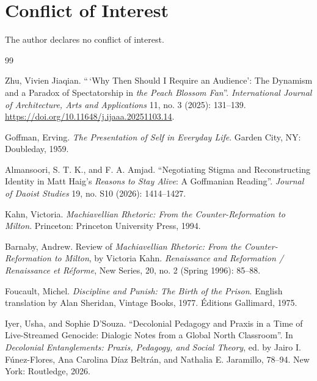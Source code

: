 \documentclass[10pt]{article}
\begin{document}
\newpage
\section*{Conflict of Interest}
The author declares no conflict of interest.

\begin{thebibliography}{99}
\setlength{\itemsep}{0.6em}

 Zhu, Vivien Jiaqian. ``\,`Why Then Should I Require an Audience': The Dynamism and a Paradox of Spectatorship in \emph{the Peach Blossom Fan}''. \emph{International Journal of Architecture, Arts and Applications} 11, no. 3 (2025): 131--139. \url{https://doi.org/10.11648/j.ijaaa.20251103.14}.

 Goffman, Erving. \emph{The Presentation of Self in Everyday Life}. Garden City, NY: Doubleday, 1959.

 Almansoori, S. T. K., and F. A. Amjad. ``Negotiating Stigma and Reconstructing Identity in Matt Haig's \emph{Reasons to Stay Alive}: A Goffmanian Reading''. \emph{Journal of Daoist Studies} 19, no. S10 (2026): 1414--1427.

 Kahn, Victoria. \emph{Machiavellian Rhetoric: From the Counter-Reformation to Milton}. Princeton: Princeton University Press, 1994.

 Barnaby, Andrew. Review of \emph{Machiavellian Rhetoric: From the Counter-Reformation to Milton}, by Victoria Kahn. \emph{Renaissance and Reformation / Renaissance et R\'eforme}, New Series, 20, no. 2 (Spring 1996): 85--88.

 Foucault, Michel. \emph{Discipline and Punish: The Birth of the Prison}. English translation by Alan Sheridan, Vintage Books, 1977. \'Editions Gallimard, 1975.

 Iyer, Usha, and Sophie D'Souza. ``Decolonial Pedagogy and Praxis in a Time of Live-Streamed Genocide: Dialogic Notes from a Global North Classroom''. In \emph{Decolonial Entanglements: Praxis, Pedagogy, and Social Theory}, ed. by Jairo I. F\'unez-Flores, Ana Carolina D\'iaz Beltr\'an, and Nathalia E. Jaramillo, 78--94. New York: Routledge, 2026.


\end{thebibliography}
\end{document}
